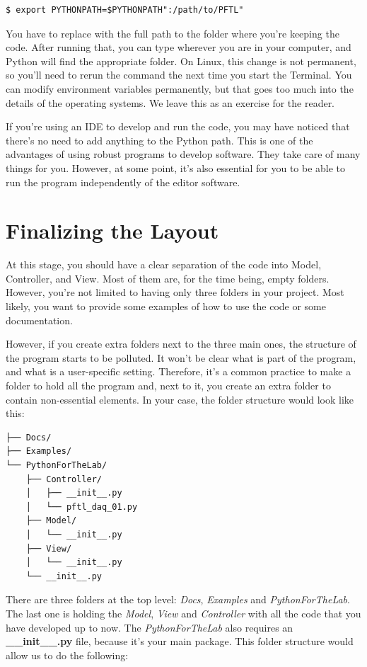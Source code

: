 \begin{verbatim}
$ export PYTHONPATH=$PYTHONPATH":/path/to/PFTL"
\end{verbatim}

You have to replace  with the full path to the folder where you're keeping the code. After running that, you can type  wherever you are in your computer, and Python will find the appropriate folder. On Linux, this change is not permanent, so you'll need to rerun the command the next time you start the Terminal. You can modify environment variables permanently, but that goes too much into the details of the operating systems. We leave this as an exercise for the reader.

If you're using an IDE to develop and run the code, you may have noticed that there's no need to add anything to the Python path. This is one of the advantages of using robust programs to develop software. They take care of many things for you. However, at some point, it's also essential for you to be able to run the program independently of the editor software.

\section{Finalizing the Layout}\label{sec:final-layout}
At this stage, you should have a clear separation of the code into Model, Controller, and View. Most of them are, for the time being, empty folders. However, you're not limited to having only three folders in your project. Most likely, you want to provide some examples of how to use the code or some documentation.

However, if you create extra folders next to the three main ones, the structure of the program starts to be polluted. It won't be clear what is part of the program, and what is a user-specific setting. Therefore, it's a common practice to make a folder to hold all the program and, next to it, you create an extra folder to contain non-essential elements. In your case, the folder structure would look like this:

\begin{verbatim}
├── Docs/
├── Examples/
└── PythonForTheLab/
    ├── Controller/
    │   ├── __init__.py
    │   └── pftl_daq_01.py
    ├── Model/
    │   └── __init__.py
    ├── View/
    │   └── __init__.py
    └── __init__.py
\end{verbatim}

There are three folders at the top level: \emph{Docs}, \emph{Examples} and \emph{PythonForTheLab}. The last one is holding the \emph{Model}, \emph{View} and \emph{Controller} with all the code that you have developed up to now. The \emph{PythonForTheLab} also requires an \textbf{\_\_init\_\_.py} file, because it's your main package. This folder structure would allow us to do the following:

